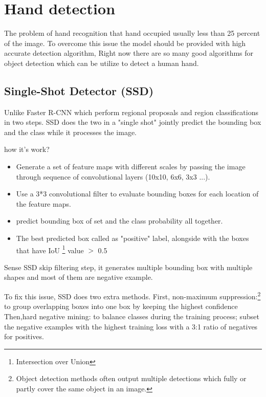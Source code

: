 \documentclass[12pt]{report}
\begin{document}
\clearpage

\section{Hand detection}

The problem of hand recognition that hand occupied usually less than 25 percent of the image.
To overcome this issue the model should be provided with high accurate detection algorithm,
Right now there are so many good algorithms for object detection which can be utilize to 
detect a human hand.

\subsection{Single-Shot Detector (SSD)}

Unlike Faster R-CNN which perform regional proposals 
and region classifications in two steps. SSD does the two in a "single shot"
jointly predict the bounding box and the class while it processes the image.

how it's work?
\begin{itemize}
    \item Generate a set of feature maps with different scales by passing 
    the image through sequence of convolutional layers (10x10, 6x6, 3x3 ...).
    \item Use a 3*3 convolutional filter to evaluate bounding boxes for each 
    location of the feature maps.
    \item predict bounding box of set and the class probability all together.
    \item The best predicted box called as "positive" label, alongside with
    the boxes that have IoU \footnote{Intersection over Union } value $>$ 0.5 
\end{itemize}
Sense SSD skip filtering step, it generates multiple bounding box with multiple shapes
and most of them are negative example.

To fix this issue, SSD does two extra methods.
First, non-maximum suppression:\footnote{Object detection methods often output 
multiple detections which fully or partly cover the same object in an image.}
to group overlapping boxes into one box by keeping the highest confidence
Then,hard negative mining: to balance classes during the training process; 
subset the negative examples with the highest training loss with a 3:1 ratio 
of negatives for positives.\cite{Liu2016}
\end{document}
